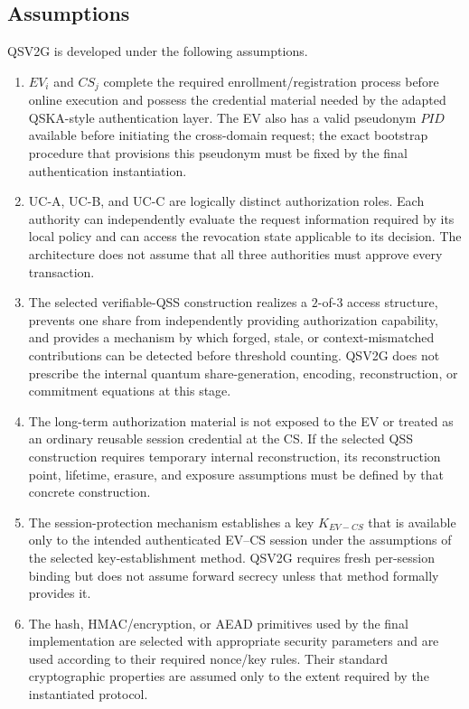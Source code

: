 \documentclass[twocolumn,10pt,journal]{IEEEtran}
\begin{document}
\subsection{Assumptions}
QSV2G is developed under the following assumptions.
\begin{enumerate}[leftmargin=*]
    \item $EV_i$ and $CS_j$ complete the required enrollment/registration process before online execution and possess the credential material needed by the adapted QSKA-style authentication layer. The EV also has a valid pseudonym $PID$ available before initiating the cross-domain request; the exact bootstrap procedure that provisions this pseudonym must be fixed by the final authentication instantiation.

    \item UC-A, UC-B, and UC-C are logically distinct authorization roles. Each authority can independently evaluate the request information required by its local policy and can access the revocation state applicable to its decision. The architecture does not assume that all three authorities must approve every transaction.

    \item The selected verifiable-QSS construction realizes a $2$-of-$3$ access structure, prevents one share from independently providing authorization capability, and provides a mechanism by which forged, stale, or context-mismatched contributions can be detected before threshold counting. QSV2G does not prescribe the internal quantum share-generation, encoding, reconstruction, or commitment equations at this stage.

    \item The long-term authorization material is not exposed to the EV or treated as an ordinary reusable session credential at the CS. If the selected QSS construction requires temporary internal reconstruction, its reconstruction point, lifetime, erasure, and exposure assumptions must be defined by that concrete construction.

    \item The session-protection mechanism establishes a key $K_{EV-CS}$ that is available only to the intended authenticated EV--CS session under the assumptions of the selected key-establishment method. QSV2G requires fresh per-session binding but does not assume forward secrecy unless that method formally provides it.

    \item The hash, HMAC/encryption, or AEAD primitives used by the final implementation are selected with appropriate security parameters and are used according to their required nonce/key rules. Their standard cryptographic properties are assumed only to the extent required by the instantiated protocol.


\end{enumerate}
\end{document}
